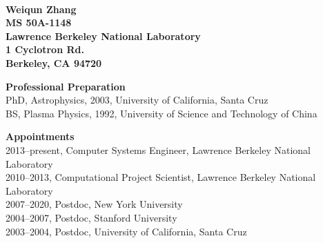 \documentclass[11pt,letterpaper,english]{article}
\begin{document}
\setlength{\parindent}{0in} %

\pagestyle{fancy}   \renewcommand{%
\headrulewidth}{0.0pt}



\\
{\bf Weiqun Zhang}\\
{\bf 
  MS 50A-1148\\
  Lawrence Berkeley National Laboratory\\
  1 Cyclotron Rd.\\
  Berkeley, CA 94720
} \smallskip

\begin{flushleft} {\bf Professional Preparation}
{\parindent 16pt\\
PhD, Astrophysics, 2003, University of California, Santa Cruz \\ 
BS, Plasma Physics, 1992, University of Science and Technology of China 
}

\vspace{.04in}
{\bf Appointments}
{\parindent 16pt\\
2013--present, Computer Systems Engineer, Lawrence Berkeley National Laboratory\\
2010--2013, Computational Project Scientist, Lawrence Berkeley National Laboratory\\ 
2007--2020, Postdoc, New York University \\
2004--2007, Postdoc, Stanford University \\ 
2003--2004, Postdoc, University of California, Santa Cruz
}


\end{flushleft}
\end{document}
